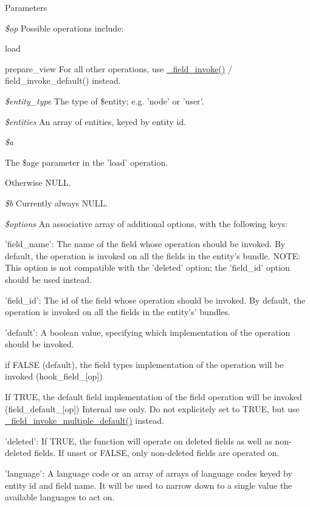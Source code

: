 \begin{DoxyParams}{Parameters}
\item[{\em \$op}]Possible operations include:
\begin{DoxyItemize}
\item load
\item prepare\_\-view For all other operations, use \hyperlink{group__field__attach_ga65f891a5eea6513f8505f5cfc5894896}{\_\-field\_\-invoke()} / field\_\-invoke\_\-default() instead. 
\end{DoxyItemize}\item[{\em \$entity\_\-type}]The type of \$entity; e.g. 'node' or 'user'. \item[{\em \$entities}]An array of entities, keyed by entity id. \item[{\em \$a}]
\begin{DoxyItemize}
\item The \$age parameter in the 'load' operation.
\item Otherwise NULL. 
\end{DoxyItemize}\item[{\em \$b}]Currently always NULL. \item[{\em \$options}]An associative array of additional options, with the following keys:
\begin{DoxyItemize}
\item 'field\_\-name': The name of the field whose operation should be invoked. By default, the operation is invoked on all the fields in the entity's bundle. NOTE: This option is not compatible with the 'deleted' option; the 'field\_\-id' option should be used instead.
\item 'field\_\-id': The id of the field whose operation should be invoked. By default, the operation is invoked on all the fields in the entity's' bundles.
\item 'default': A boolean value, specifying which implementation of the operation should be invoked.
\begin{DoxyItemize}
\item if FALSE (default), the field types implementation of the operation will be invoked (hook\_\-field\_\-\mbox{[}op\mbox{]})
\item If TRUE, the default field implementation of the field operation will be invoked (field\_\-default\_\-\mbox{[}op\mbox{]}) Internal use only. Do not explicitely set to TRUE, but use \hyperlink{group__field__attach_gae25199cb48ebcbe016ed158985c755ef}{\_\-field\_\-invoke\_\-multiple\_\-default()} instead.
\end{DoxyItemize}
\item 'deleted': If TRUE, the function will operate on deleted fields as well as non-\/deleted fields. If unset or FALSE, only non-\/deleted fields are operated on.
\item 'language': A language code or an array of arrays of language codes keyed by entity id and field name. It will be used to narrow down to a single value the available languages to act on.
\end{DoxyItemize}\end{DoxyParams}
